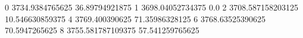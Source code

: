 0 3734.9384765625 36.89794921875
1 3698.04052734375 0.0
2 3708.587158203125 10.546630859375
4 3769.400390625 71.35986328125
6 3768.63525390625 70.5947265625
8 3755.581787109375 57.541259765625
